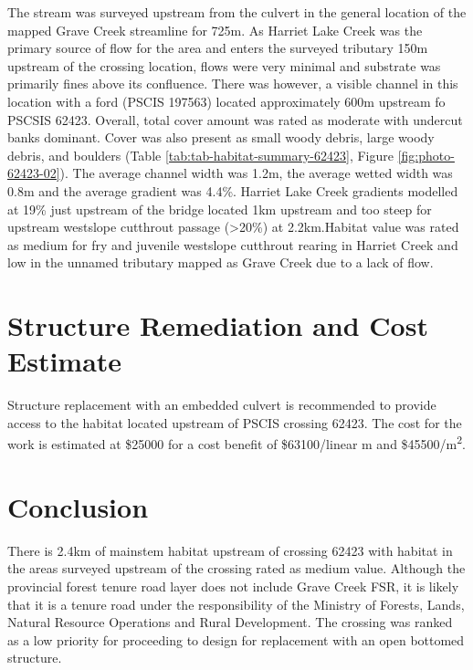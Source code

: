 \documentclass[
]{book}
\begin{document}
The stream was surveyed upstream from the culvert in the general location of the mapped Grave Creek streamline for 725m. As Harriet Lake Creek was the primary source of flow for the area and enters the surveyed tributary 150m upstream of the crossing location, flows were very minimal and substrate was primarily fines above its confluence. There was however, a visible channel in this location with a ford (PSCIS 197563) located approximately 600m upstream fo PSCSIS 62423. Overall, total cover amount was rated as moderate with undercut banks dominant. Cover was also present as small woody debris, large woody debris, and boulders (Table \ref{tab:tab-habitat-summary-62423}, Figure \ref{fig:photo-62423-02}). The average channel width was 1.2m, the average wetted width was 0.8m and the average gradient was 4.4\%. Harriet Lake Creek gradients modelled at 19\% just upstream of the bridge located 1km upstream and too steep for upstream westslope cutthrout passage (\textgreater20\%) at 2.2km.Habitat value was rated as medium for fry and juvenile westslope cutthrout rearing in Harriet Creek and low in the unnamed tributary mapped as Grave Creek due to a lack of flow.

\hypertarget{structure-remediation-and-cost-estimate-3}{%
\section*{Structure Remediation and Cost Estimate}\label{structure-remediation-and-cost-estimate-3}}

Structure replacement with an embedded culvert is recommended to provide access to the habitat located upstream of PSCIS crossing 62423. The cost for the work is estimated at \$25000 for a cost benefit of \$63100/linear m and \$45500/m\textsuperscript{2}.

\hypertarget{conclusion-4}{%
\section*{Conclusion}\label{conclusion-4}}

There is 2.4km of mainstem habitat upstream of crossing 62423 with habitat in the areas surveyed upstream of the crossing rated as medium value. Although the provincial forest tenure road layer does not include Grave Creek FSR, it is likely that it is a tenure road under the responsibility of the Ministry of Forests, Lands, Natural Resource Operations and Rural Development. The crossing was ranked as a low priority for proceeding to design for replacement with an open bottomed structure.
\end{document}
